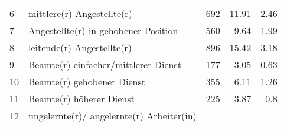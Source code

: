 \begin{longtable}{lXrrr}
     6 &
     \multicolumn{1}{X}{ mittlere(r) Angestellte(r)   } &


       \num{692} &
       \num[round-mode=places,round-precision=2]{11.91} &
         \num[round-mode=places,round-precision=2]{2.46} \\

     7 &
     \multicolumn{1}{X}{ Angestellte(r) in gehobener Position   } &


       \num{560} &
       \num[round-mode=places,round-precision=2]{9.64} &
         \num[round-mode=places,round-precision=2]{1.99} \\

     8 &
     \multicolumn{1}{X}{ leitende(r) Angestellte(r)   } &


       \num{896} &
       \num[round-mode=places,round-precision=2]{15.42} &
         \num[round-mode=places,round-precision=2]{3.18} \\

     9 &
     \multicolumn{1}{X}{ Beamte(r) einfacher/mittlerer Dienst   } &


       \num{177} &
       \num[round-mode=places,round-precision=2]{3.05} &
         \num[round-mode=places,round-precision=2]{0.63} \\

     10 &
     \multicolumn{1}{X}{ Beamte(r) gehobener Dienst   } &


       \num{355} &
       \num[round-mode=places,round-precision=2]{6.11} &
         \num[round-mode=places,round-precision=2]{1.26} \\

     11 &
     \multicolumn{1}{X}{ Beamte(r) höherer Dienst   } &


       \num{225} &
       \num[round-mode=places,round-precision=2]{3.87} &
         \num[round-mode=places,round-precision=2]{0.8} \\

     12 &
     \multicolumn{1}{X}{ ungelernte(r)/ angelernte(r) Arbeiter(in)   } &



\end{longtable}
